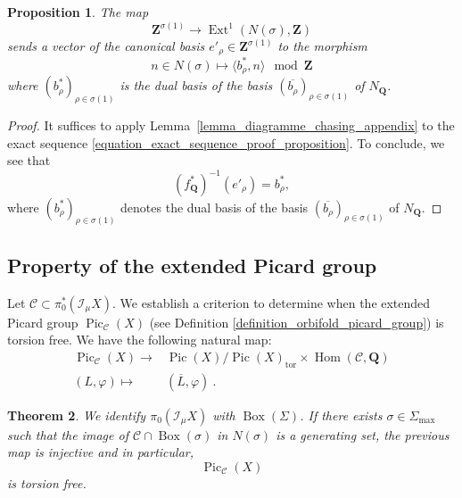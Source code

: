 \documentclass{proc-l}
\newcommand{\Z}{\mathbf{Z}}
\newcommand{\Q}{\mathbf{Q}}
\DeclareMathOperator{\Pic}{Pic}
\DeclareMathOperator{\Hom}{Hom}
\DeclareMathOperator{\Ext}{Ext}
\DeclareMathOperator{\tor}{tor}
\DeclareMathOperator{\Boxe}{Box}
\newcommand{\sheafI}{\mathcal{I}}
\newcommand{\sector}{\pi_0(\sheafI_{\mu} X)}
\newcommand{\twistsector}{\pi_0^*(\sheafI_{\mu} X)}
\newtheorem{theorem}{Theorem}[section]
\newtheorem{prop}[theorem]{Proposition}
\theoremstyle{definition}
\theoremstyle{remark}
\numberwithin{equation}{section}
\begin{document}
\begin{prop}\label{proposition_diagramme_chasing_appendix}
    The map $$\Z^{\sigma(1)} \rightarrow \Ext^1(N(\sigma),\Z) $$sends a vector of the canonical basis $e'_{\rho} \in \Z^{\sigma(1)}$ to the morphism $$n \in N(\sigma) \longmapsto \langle b_{\rho}^* , n \rangle \mod \Z $$where $(b_{\rho}^*)_{\rho \in \sigma(1)}$ is the dual basis of the basis $(\overline{b_{\rho}})_{\rho \in \sigma(1)}$ of $N_{\Q}$.
\end{prop}

\begin{proof}
It suffices to apply Lemma~\ref{lemma_diagramme_chasing_appendix} to the exact sequence \eqref{equation_exact_sequence_proof_proposition}. To conclude, we see that
\[
(f_{\Q}^*)^{-1}(e'_{\rho}) = b_{\rho}^*,
\]
where $(b_{\rho}^*)_{\rho \in \sigma(1)}$ denotes the dual basis of the basis $(\overline{b_{\rho}})_{\rho \in \sigma(1)}$ of $N_{\Q}$.
\end{proof}




\subsection{Property of the extended Picard group}



Let $\mathcal{C} \subset \twistsector$. We establish a criterion to determine when the extended Picard group $\Pic_{\mathcal{C}}(X)$ (see Definition \ref{definition_orbifold_picard_group}) is torsion free. We have the following natural map:
\begin{align*}
\Pic_{\mathcal{C}}(X) \longrightarrow &\Pic(X) / \Pic(X)_{\tor} \times \Hom(\mathcal{C},\Q) \\
 (L,\varphi) \longmapsto &\left( \overline{L}  , \varphi \right) \ .
\end{align*}

\begin{theorem}\label{appendix_a_theorem_freeness_orbifold_picard_group}
    We identify $\sector$ with $\Boxe(\Sigma)$. If there exists $\sigma \in \Sigma_{\max}$ such that the image of $\mathcal{C} \cap \Boxe(\sigma)$ in $N(\sigma)$ is a generating set, the previous map is injective and in particular, $$\Pic_{\mathcal{C}}(X)$$ is torsion free.
\end{theorem}
\end{document}
